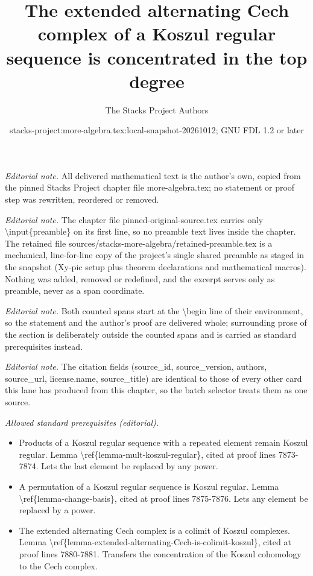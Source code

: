 \documentclass[10pt,a4paper]{amsart}
\title{The extended alternating Cech complex of a Koszul regular sequence is concentrated in the top degree}
\author{The Stacks Project Authors}
\date{stacks-project:more-algebra.tex:local-snapshot-20261012; GNU FDL 1.2 or later}
\theoremstyle{plain}
\theoremstyle{definition}
\theoremstyle{remark}
\numberwithin{equation}{subsection}
\begin{document}
\maketitle
\setcounter{subsection}{1}
\noindent\textit{Editorial note.} All delivered mathematical text is the author's own, copied from the pinned Stacks Project chapter file more-algebra.tex; no statement or proof step was rewritten, reordered or removed.\par\medskip
\noindent\textit{Editorial note.} The chapter file pinned-original-source.tex carries only \textbackslash{}input\{preamble\} on its first line, so no preamble text lives inside the chapter. The retained file sources/stacks-more-algebra/retained-preamble.tex is a mechanical, line-for-line copy of the project's single shared preamble as staged in the snapshot (Xy-pic setup plus theorem declarations and mathematical macros). Nothing was added, removed or redefined, and the excerpt serves only as preamble, never as a span coordinate.\par\medskip
\noindent\textit{Editorial note.} Both counted spans start at the \textbackslash{}begin line of their environment, so the statement and the author's proof are delivered whole; surrounding prose of the section is deliberately outside the counted spans and is carried as standard prerequisites instead.\par\medskip
\noindent\textit{Editorial note.} The citation fields (source\_id, source\_version, authors, source\_url, license.name, source\_title) are identical to those of every other card this lane has produced from this chapter, so the batch selector treats them as one source.\par\medskip
\noindent\textit{Allowed standard prerequisites (editorial).}\begin{itemize}
\item Products of a Koszul regular sequence with a repeated element remain Koszul regular. Lemma \textbackslash{}ref\{lemma-mult-koszul-regular\}, cited at proof lines 7873-7874. Lets the last element be replaced by any power.
\item A permutation of a Koszul regular sequence is Koszul regular. Lemma \textbackslash{}ref\{lemma-change-basis\}, cited at proof lines 7875-7876. Lets any element be replaced by a power.
\item The extended alternating Cech complex is a colimit of Koszul complexes. Lemma \textbackslash{}ref\{lemma-extended-alternating-Cech-is-colimit-koszul\}, cited at proof lines 7880-7881. Transfers the concentration of the Koszul cohomology to the Cech complex.
\end{itemize}\medskip
\end{document}
